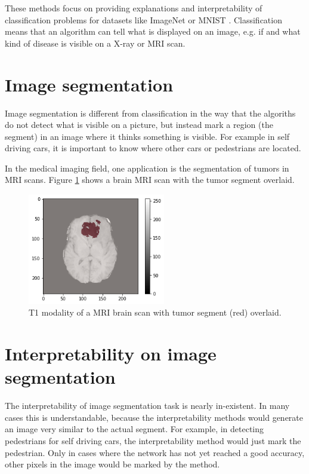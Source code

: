 These methods focus on providing explanations and interpretability of classification problems for datasets like ImageNet \cite{imagenet_cvpr09} or MNIST \cite{lecun1998gradient}. Classification means that an algorithm can tell what is displayed on an image, e.g. if and what kind of disease is visible on a X-ray or MRI scan.

\section{Image segmentation}
Image segmentation is different from classification in the way that the algoriths do not detect what is visible on a picture, but instead mark a region (the segment) in an image where it thinks something is visible. For example in self driving cars, it is important to know where other cars or pedestrians are located. 

In the medical imaging field, one application is the segmentation of tumors in MRI scans. Figure \ref{introduction_tumor} shows a brain MRI scan with the tumor segment overlaid.

\begin{figure}[h]
\centering
\includegraphics[width=6cm]{chapters/01_introduction/images/tumor_segment.png}
\caption{T1 modality of a MRI brain scan with tumor segment (red) overlaid.}
\label{introduction_tumor}
\end{figure}


\section{Interpretability on image segmentation}
The interpretability of image segmentation task is nearly in-existent. In many cases this is understandable, because the interpretability methods would generate an image very similar to the actual segment. For example, in detecting pedestrians for self driving cars, the interpretability method would just mark the pedestrian. Only in cases where the network has not yet reached a good accuracy, other pixels in the image would be marked by the method.

